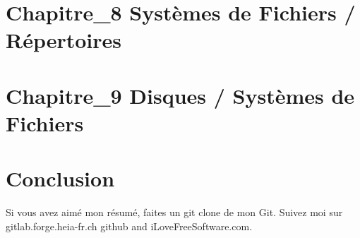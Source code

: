 \newpage
\section{Chapitre\_8 Systèmes de Fichiers / Répertoires}

















\newpage
\section{Chapitre\_9 Disques / Systèmes de Fichiers}














































\newpage
\section{Conclusion}
Si vous avez aimé mon résumé, faites un git clone de mon Git. Suivez moi sur gitlab.forge.heia-fr.ch github and iLoveFreeSoftware.com.


